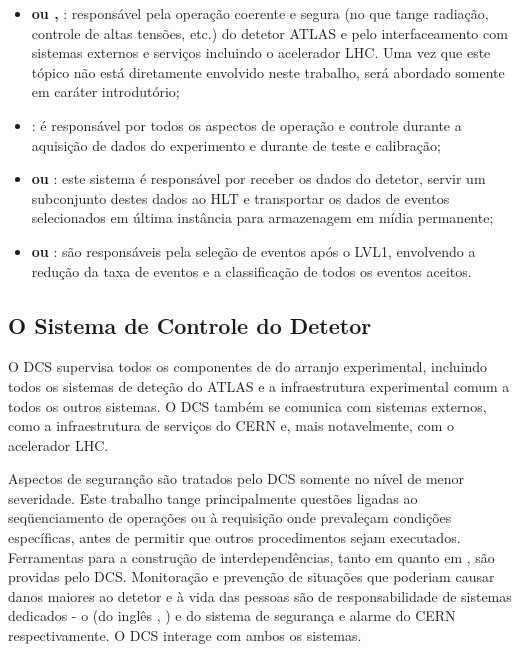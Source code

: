 \begin{itemize}
\item \textbf{ ou , }: responsável pela operação coerente e segura (no que tange
radiação, controle de altas tensões, etc.) do detetor ATLAS e pelo
interfaceamento com sistemas externos e serviços incluindo o acelerador
LHC. Uma vez que este tópico não está diretamente envolvido neste trabalho,
será abordado somente em caráter introdutório;

\item \textbf{}: é responsável por todos os aspectos de
operação e controle durante a aquisição de dados do experimento e durante
 de teste e calibração;

\item \textbf{ ou }: este sistema é
responsável por receber os dados do detetor, servir um subconjunto destes
dados ao HLT e transportar os dados de eventos selecionados em última
instância para armazenagem em mídia permanente;

\item \textbf{ ou }: são responsáveis pela
seleção de eventos após o LVL1, envolvendo a redução da taxa de eventos e a
classificação de todos os eventos aceitos.

\end{itemize}

\subsection{O Sistema de Controle do Detetor}
\label{sec:dcs}

O DCS supervisa todos os componentes de  do arranjo
experimental, incluindo todos os sistemas de deteção do ATLAS e a
infraestrutura experimental comum a todos os outros sistemas. O DCS também se
comunica com sistemas externos, como a infraestrutura de serviços do CERN e,
mais notavelmente, com o acelerador LHC.

Aspectos de seguranção são tratados pelo DCS somente no nível de menor
severidade. Este trabalho tange principalmente questões ligadas ao
seqüenciamento de operações ou à requisição onde prevaleçam condições
específicas, antes de permitir que outros procedimentos sejam
executados. Ferramentas para a construção de interdependências, tanto em
 quanto em , são providas pelo DCS. Monitoração e
prevenção de situações que poderiam causar danos maiores ao detetor e à vida
das pessoas são de responsabilidade de sistemas dedicados - o  (do inglês , ) e
do sistema de segurança e alarme do CERN respectivamente. O DCS interage com
ambos os sistemas.

